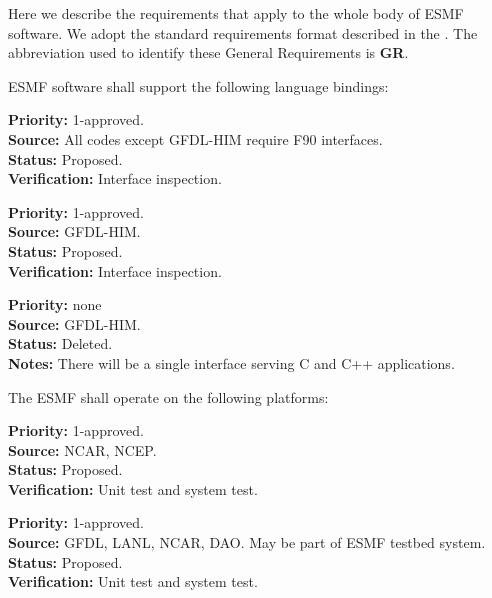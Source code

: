 
Here we describe the requirements that apply to the whole body of 
ESMF software.  We adopt the standard requirements format described in 
the .  The abbreviation used to identify
these General Requirements is {\bf GR}.


ESMF software shall support the following language bindings:

\begin{reqlist}
{\bf Priority:} 1-approved. \\
{\bf Source:} All codes except GFDL-HIM require F90 interfaces. \\
{\bf Status:} Proposed. \\
{\bf Verification:} Interface inspection. 
\end{reqlist}

\begin{reqlist}
{\bf Priority:} 1-approved. \\
{\bf Source:} GFDL-HIM. \\
{\bf Status:} Proposed. \\
{\bf Verification:} Interface inspection.
\end{reqlist}

\begin{reqlist}
  {\bf Priority:} none \\
  {\bf Source:} GFDL-HIM. \\
  {\bf Status:} Deleted. \\
  {\bf Notes:} There will be a single interface serving C and C++
  applications.
\end{reqlist}

The ESMF shall operate on the following platforms:

\begin{reqlist}
{\bf Priority:} 1-approved. \\
{\bf Source:} NCAR, NCEP. \\
{\bf Status:} Proposed. \\
{\bf Verification:} Unit test and system test.
\end{reqlist}

\begin{reqlist}
{\bf Priority:} 1-approved. \\
{\bf Source:} GFDL, LANL, NCAR, DAO.  May be part of ESMF testbed system. \\
{\bf Status:} Proposed. \\
{\bf Verification:} Unit test and system test.
\end{reqlist}

